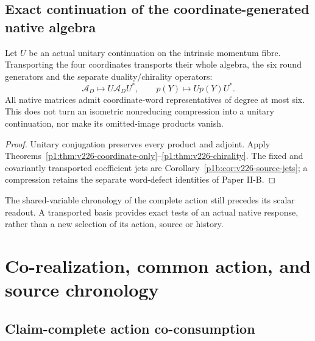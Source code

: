 \documentclass[12pt,a4paper]{article}
\begin{document}
\subsection{Exact continuation of the coordinate-generated native algebra}
\label{p3a:sec:v226-coordinate-continuation}
\begin{corollary}
\label{p3a:cor:v226-coordinate-continuation}
Let $U$ be an actual unitary continuation on the intrinsic momentum fibre.
Transporting the four coordinates transports their whole algebra, the six
round generators and the separate duality/chirality operators:
\[
 \mathcal A_D\longmapsto U\mathcal A_DU^*,\qquad
 p(Y)\longmapsto Up(Y)U^*.
\]
All native matrices admit coordinate-word representatives of degree at most
six. This does not turn an isometric nonreducing compression into a unitary
continuation, nor make its omitted-image products vanish.
\end{corollary}
\begin{proof}
Unitary conjugation preserves every product and adjoint. Apply
Theorems~\ref{p1:thm:v226-coordinate-only}--\ref{p1:thm:v226-chirality}.
The fixed and covariantly transported coefficient jets are
Corollary~\ref{p1b:cor:v226-source-jets}; a compression retains the separate
word-defect identities of Paper II-B.
\end{proof}
The shared-variable chronology of the complete action still precedes its
scalar readout. A transported basis provides exact tests of an actual
native response, rather than a new selection of its action, source or history.



\section{Co-realization, common action, and source chronology}
\label{paper3a:sec:organized-action}
\subsection{Claim-complete action co-consumption}
\label{p3a:sec:v183-action-coconsumption}
\end{document}
